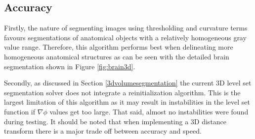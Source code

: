 \subsection{Accuracy}
Firstly, the nature of segmenting images using thresholding and curvature terms favours segmentations of anatomical objects with a relatively homogeneous gray value range. Therefore, this algorithm performs best when delineating more homogeneous anatomical structures as can be seen with the detailed brain segmentation shown in Figure \ref{fig:brain3d}.
	
Secondly, as discussed in Section \ref{3dvolumesegmentation} the current 3D level set segmentation solver does not integrate a reinitialization algorithm. This is the largest limitation of this algorithm as it may result in instabilities in the level set function if $\nabla\phi$ values get too large. That said, almost no instabilities were found during testing. It should be noted that when implementing a 3D distance transform there is a major trade off between accuracy and speed. 



